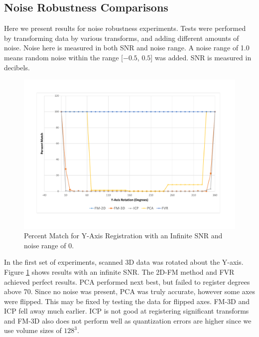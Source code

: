 
\subsection{Noise Robustness Comparisons}

Here we present results for noise robustness experiments. Tests were performed by transforming data by various transforms, and adding different amounts of noise. Noise here is measured in both SNR and noise range. A noise range of 1.0 means random noise within the range [$-0.5$, $0.5$] was added. SNR is measured in decibels. 

\begin{figure}[t]
\centering
\includegraphics[width=6.0in]{images/results/noise/YRNoise0}
\caption{Percent Match for Y-Axis Registration with an Infinite SNR and noise range of $0$.}
\label{fig:YRNoise0}
\end{figure}

In the first set of experiments, scanned 3D data was rotated about the Y-axis. Figure \ref{fig:YRNoise0} shows results with an infinite SNR. The 2D-FM method and FVR achieved perfect results. PCA performed next best, but failed to register degrees above 70. Since no noise was present, PCA was truly accurate, however some axes were flipped. This may be fixed by testing the data for flipped axes. FM-3D and ICP fell away much earlier. ICP is not good at registering significant transforms and FM-3D also does not perform well as quantization errors are higher since we use volume sizes of $128^3$.

